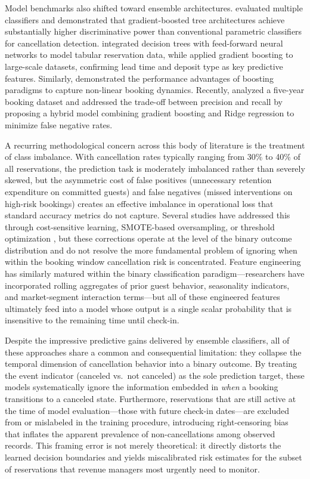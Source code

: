 \documentclass[pdflatex,iicol,sn-mathphys-ay]{sn-jnl}
\theoremstyle{thmstyleone}%
\theoremstyle{thmstyletwo}%
\theoremstyle{thmstylethree}%
\begin{document}
Model benchmarks also shifted toward ensemble architectures. \cite{yoo2024predicting} evaluated multiple classifiers and demonstrated that gradient-boosted tree architectures achieve substantially higher discriminative power than conventional parametric classifiers for cancellation detection. \cite{yang2024predicting} integrated decision trees with feed-forward neural networks to model tabular reservation data, while \cite{luo2025hotel} applied gradient boosting to large-scale datasets, confirming lead time and deposit type as key predictive features. Similarly, \cite{febrian2024hotel} demonstrated the performance advantages of boosting paradigms to capture non-linear booking dynamics. Recently, \cite{ampountolas2025predicting} analyzed a five-year booking dataset and addressed the trade-off between precision and recall by proposing a hybrid model combining gradient boosting and Ridge regression to minimize false negative rates.

A recurring methodological concern across this body of literature is the treatment of class imbalance. With cancellation rates typically ranging from 30\% to 40\% of all reservations, the prediction task is moderately imbalanced rather than severely skewed, but the asymmetric cost of false positives (unnecessary retention expenditure on committed guests) and false negatives (missed interventions on high-risk bookings) creates an effective imbalance in operational loss that standard accuracy metrics do not capture. Several studies have addressed this through cost-sensitive learning, SMOTE-based oversampling, or threshold optimization \citep{liu2023hospitality, ampountolas2025predicting}, but these corrections operate at the level of the binary outcome distribution and do not resolve the more fundamental problem of ignoring when within the booking window cancellation risk is concentrated. Feature engineering has similarly matured within the binary classification paradigm—researchers have incorporated rolling aggregates of prior guest behavior, seasonality indicators, and market-segment interaction terms—but all of these engineered features ultimately feed into a model whose output is a single scalar probability that is insensitive to the remaining time until check-in.

Despite the impressive predictive gains delivered by ensemble classifiers, all of these approaches share a common and consequential limitation: they collapse the temporal dimension of cancellation behavior into a binary outcome. By treating the event indicator (canceled vs.\ not canceled) as the sole prediction target, these models systematically ignore the information embedded in \textit{when} a booking transitions to a canceled state. Furthermore, reservations that are still active at the time of model evaluation—those with future check-in dates—are excluded from or mislabeled in the training procedure, introducing right-censoring bias that inflates the apparent prevalence of non-cancellations among observed records. This framing error is not merely theoretical: it directly distorts the learned decision boundaries and yields miscalibrated risk estimates for the subset of reservations that revenue managers most urgently need to monitor.
\end{document}
